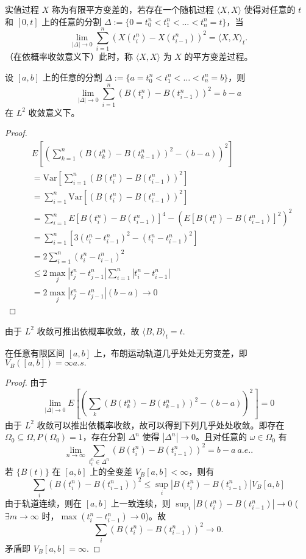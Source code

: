 \documentclass[lang=cn,10pt,thmcnt=section]{elegantbook}
\begin{document}
\begin{definition}
	实值过程 \( X \) 称为有限平方变差的，若存在一个随机过程 \(\langle X, X \rangle\) 使得对任意的 \( t \) 和 \([0, t]\) 上的任意的分割 \(\Delta := \{0 = t_0^n < t_1^n < \ldots < t_n^n = t\}\)，当
\[
\lim_{|\Delta|\to 0} \sum_{i=1}^n (X(t_i^n) - X(t_{i-1}^n))^2 = \langle X, X \rangle_t.
\]
（在依概率收敛意义下）此时，称 \(\langle X, X \rangle\) 为 \( X \) 的平方变差过程。
\end{definition}
\begin{theorem}
	设 \([a, b]\) 上的任意的分割 \(\Delta := \{a = t_0^n < t_1^n < \ldots < t_n^n = b\}\)，则
\[
\lim_{|\Delta|\to 0} \sum_{i=1}^n (B(t_i^n) - B(t_{i-1}^n))^2 = b - a
\]
在 \(L^2\) 收敛意义下。
\end{theorem}
\begin{proof}
	\begin{align*}
		&E\left[\left(\sum_{k=1}^n (B(t_k^n) - B(t_{k-1}^n))^2 - (b-a)\right)^2\right] \\
		&= \text{Var}\left[\sum_{i=1}^n (B(t_i^n) - B(t_{i-1}^n))^2\right] \\
		&= \sum_{i=1}^n \text{Var}\left[(B(t_i^n) - B(t_{i-1}^n))^2\right] \\
		&= \sum_{i=1}^n E\left[B(t_i^n) - B(t_{i-1}^n)\right]^4 - \left(E\left[B(t_i^n) - B(t_{i-1}^n)\right]^2\right)^2 \\
		&= \sum_{i=1}^n \left[3(t_i^n - t_{i-1}^n)^2 - (t_i^n - t_{i-1}^n)^2\right] \\
		&= 2\sum_{i=1}^n (t_i^n - t_{i-1}^n)^2\\
		&\leq 2 \max_j |t_j^n - t_{j-1}^n| \sum_{i=1}^n |t_i^n - t_{i-1}^n| \\
		&= 2 \max_j |t_j^n - t_{j-1}^n| (b-a) \to 0
	\end{align*}
\end{proof}
\begin{remark}

	由于 \(L^2\) 收敛可推出依概率收敛，故 \(\langle B, B \rangle_t = t\).
\end{remark}
\begin{corollary}
	在任意有限区间 \([a, b]\) 上，布朗运动轨道几乎处处无穷变差，即 \(V_B([a,b]) = \infty a.s.\)
\end{corollary}
\begin{proof}
	由于
\[
\lim_{|\Delta|\to 0} E\left[\left(\sum_{k} (B(t_k^n) - B(t_{k-1}^n))^2 - (b-a)\right)^2\right] = 0
\]
由于 \(L^2\) 收敛可以推出依概率收敛，故可以得到下列几乎处处收敛。即存在 \(\Omega_0 \subseteq \Omega, P(\Omega_0) = 1\)，存在分割 \(\Delta^n\) 使得 \(|\Delta^n| \to 0\)。且对任意的 \(\omega \in \Omega_0\) 有
\[
\lim_{n\to\infty} \sum_{t_i^n \in \Delta^n} (B(t_i^n) - B(t_{i-1}^n))^2 = b - a \ a.e..
\]
若 \(\{B(t)\}\) 在 \([a, b]\) 上的全变差 \(V_B[a, b] < \infty\)，则有
\[
\sum_i (B(t_i^n) - B(t_{i-1}^n))^2 \leq \sup_i |B(t_i^n) - B(t_{i-1}^n)| V_B[a, b]
\]
由于轨道连续，则在 \([a, b]\) 上一致连续，则 \(\sup_i |B(t_i^n) - B(t_{i-1}^n)| \to 0\) (\(\exists m \to \infty\) 时，\(\max (t_i^n - t_{i-1}^n) \to 0\))。故
\[
\sum_i (B(t_i^n) - B(t_{i-1}^n))^2 \to 0.
\]
矛盾即 \(V_B[a, b] = \infty\).
\end{proof}
\end{document}
